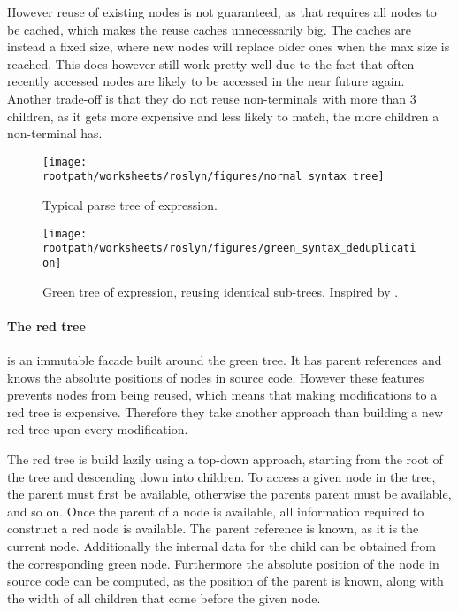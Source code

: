 However reuse of existing nodes is not guaranteed, as that requires all nodes to be cached, which makes the reuse caches unnecessarily big. The caches are instead a fixed size, where new nodes will replace older ones when the max size is reached. This does however still work pretty well due to the fact that often recently accessed nodes are likely to be accessed in the near future again\cite{sadovRoslynPerf}. Another trade-off is that they do not reuse non-terminals with more than 3 children, as it gets more expensive and less likely to match, the more children a non-terminal has\cite{sadovRoslynPerf}.

\begin{figure}[htbp]
\centering
 \texttt{[image: \\rootpath/worksheets/roslyn/figures/normal\_syntax\_tree]} 
 \caption{Typical parse tree of expression.}
\label{fig:normal_syntax_tree}
\end{figure}

\begin{figure}[htbp]
\centering
 \texttt{[image: \\rootpath/worksheets/roslyn/figures/green\_syntax\_deduplication]} 
 \caption{Green tree of expression, reusing identical sub-trees. Inspired by \cite{sadovRoslynPerf}.}
\label{fig:green_syntax_deduplication}
\end{figure}

\paragraph{The red tree} is an immutable facade built around the green tree. It has parent references and knows the absolute positions of nodes in source code. However these features prevents nodes from being reused, which means that making modifications to a red tree is expensive. Therefore they take another approach than building a new red tree upon every modification\cite{lippert2012redgreen}. 

The red tree is build lazily using a top-down approach, starting from the root of the tree and descending down into children. To access a given node in the tree, the parent must first be available, otherwise the parents parent must be available, and so on. Once the parent of a node is available, all information required to construct a red node is available. The parent reference is known, as it is the current node. Additionally the internal data for the child can be obtained from the corresponding green node. Furthermore the absolute position of the node in source code can be computed, as the position of the parent is known, along with the width of all children that come before the given node\cite{sadovRoslynPerf}.

